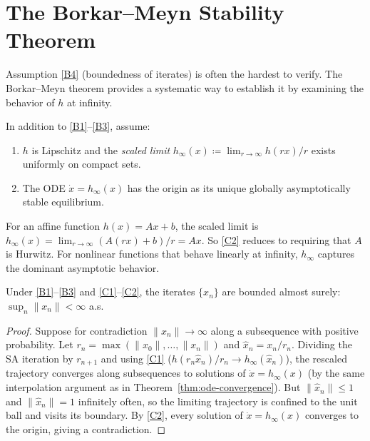 \documentclass[11pt,a4paper]{article}
\begin{document}

\section{The Borkar--Meyn Stability Theorem}
\label{sec:borkar-meyn}

Assumption \ref{B4} (boundedness of iterates) is often the hardest
to verify. The Borkar--Meyn theorem \citep{borkar2000} provides a
systematic way to establish it by examining the behavior of $h$ at
infinity.

\begin{definition}
\label{def:borkar-meyn-assumptions}
In addition to \ref{B1}--\ref{B3}, assume:
\begin{enumerate}[label=(C\arabic*)]
  \item \label{C1} $h$ is Lipschitz and the \emph{scaled limit}
    $h_\infty(x) \coloneqq \lim_{r \to \infty} h(rx)/r$ exists
    uniformly on compact sets.
  \item \label{C2} The ODE $\dot{x} = h_\infty(x)$ has the origin
    as its unique globally asymptotically stable equilibrium.
\end{enumerate}
\end{definition}

\begin{remark}
For an affine function $h(x) = Ax + b$, the scaled limit is
$h_\infty(x) = \lim_{r \to \infty}(A(rx) + b)/r = Ax$. So \ref{C2}
reduces to requiring that $A$ is Hurwitz. For nonlinear functions
that behave linearly at infinity, $h_\infty$ captures the dominant
asymptotic behavior.
\end{remark}

\begin{theorem}
\label{thm:borkar-meyn}
Under \ref{B1}--\ref{B3} and \ref{C1}--\ref{C2}, the iterates
$\{x_n\}$ are bounded almost surely:
$\sup_n \|x_n\| < \infty$ a.s.
\end{theorem}

\begin{proof}
Suppose for contradiction $\|x_n\| \to \infty$ along a subsequence
with positive probability. Let $r_n = \max(\|x_0\|, \ldots, \|x_n\|)$
and $\hat{x}_n = x_n/r_n$. Dividing the SA iteration by $r_{n+1}$
and using \ref{C1} ($h(r_n\hat{x}_n)/r_n \to h_\infty(\hat{x}_n)$),
the rescaled trajectory converges along subsequences to solutions of
$\dot{x} = h_\infty(x)$ (by the same interpolation argument as in
Theorem~\ref{thm:ode-convergence}). But $\|\hat{x}_n\| \leq 1$ and
$\|\hat{x}_n\| = 1$ infinitely often, so the limiting trajectory
is confined to the unit ball and visits its boundary. By \ref{C2},
every solution of $\dot{x} = h_\infty(x)$ converges to the origin,
giving a contradiction.
\end{proof}
\end{document}
